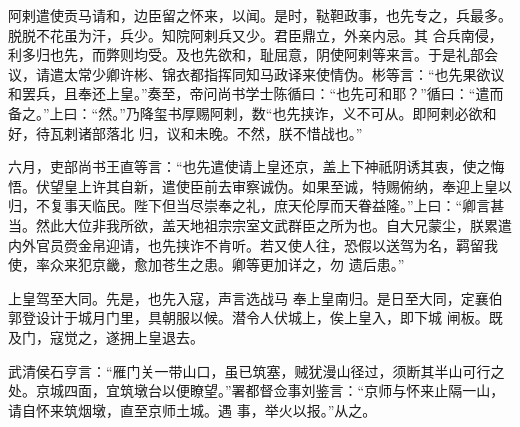 \documentclass{article}
\begin{document}
阿剌遣使贡马请和，边臣留之怀来，以闻。是时，鞑靼政事，也先专之，兵最多。脱脱不花虽为汗，兵少。知院阿剌兵又少。君臣鼎立，外亲内忌。其
\newpage
合兵南侵，利多归也先，而弊则均受。及也先欲和，耻屈意，阴使阿剌等来言。于是礼部会议，请遣太常少卿许彬、锦衣都指挥同知马政译来使情伪。彬等言：“也先果欲议和罢兵，且奉还上皇。”奏至，帝问尚书学士陈循曰：“也先可和耶？”循曰：“遣而备之。”上曰：“然。”乃降玺书厚赐阿剌，数“也先挟诈，义不可从。即阿剌必欲和好，待瓦剌诸部落北
归，议和未晚。不然，朕不惜战也。” 

六月，吏部尚书王直等言：“也先遣使请上皇还京，盖上下神祇阴诱其衷，使之悔悟。伏望皇上许其自新，遣使臣前去审察诚伪。如果至诚，特赐俯纳，奉迎上皇以归，不复事天临民。陛下但当尽崇奉之礼，庶天伦厚而天眷益隆。”上曰：“卿言甚当。然此大位非我所欲，盖天地祖宗宗室文武群臣之所为也。自大兄蒙尘，朕累遣内外官员赍金帛迎请，也先挟诈不肯听。若又使人往，恐假以送驾为名，羁留我使，率众来犯京畿，愈加苍生之患。卿等更加详之，勿
遗后患。” 

上皇驾至大同。先是，也先入寇，声言选战马
\newpage
奉上皇南归。是日至大同，定襄伯郭登设计于城月门里，具朝服以候。潜令人伏城上，俟上皇入，即下城
闸板。既及门，寇觉之，遂拥上皇退去。 

武清侯石亨言：“雁门关一带山口，虽已筑塞，贼犹漫山径过，须断其半山可行之处。京城四面，宜筑墩台以便瞭望。”署都督佥事刘鉴言：“京师与怀来止隔一山，请自怀来筑烟墩，直至京师土城。遇
事，举火以报。”从之。 
\end{document}

